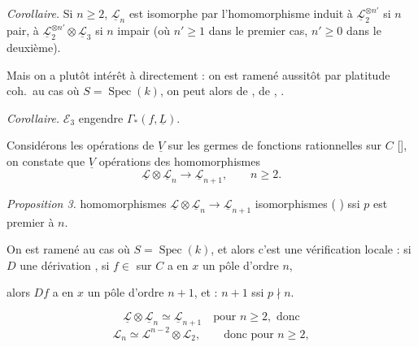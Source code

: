 \documentclass[11pt,a4paper]{article}
\begin{document}
\emph{Corollaire.} Si $n\geqslant 2$, $\underline{\mathcal{L}}_n$ est isomorphe par
l'homomorphisme induit à $\underline{\mathcal{L}}_2^{\otimes n'}$ si $n$ pair, à
$\underline{\mathcal{L}}_2^{\otimes n'}\otimes\underline{\mathcal{L}}_3$ si $n$
impair (où $n'\geqslant 1$ dans le premier cas, $n'\geqslant 0$ dans le deuxième).

Mais on a plutôt intérêt à  directement  : on est ramené aussitôt par
platitude coh.\ au cas où $S=\operatorname{Spec}(k)$, on peut alors \ill{} \ill{}
\ill{} de \ill{} \ill{} \ill{}, \ill{} \ill{} de \ill{} \ill{} \ill{}, \ill{}
\ill{} \ill{} \ill{} \ill{} \ill{} \ill{} \ill{} \ill{}.

\emph{Corollaire.} $\mathcal{E}_3$ engendre $\Gamma_*(f,\underline{L})$.

Considérons les opérations de $\underline{V}$ sur les germes de fonctions rationnelles sur $C$ [], on constate que
$\underline{V}$  opérations  des homomorphismes
\[
\underline{\mathcal{L}}\otimes\underline{\mathcal{L}}_n \longrightarrow
\underline{\mathcal{L}}_{n+1}, \qquad n\geqslant 2 .
\]

\emph{Proposition 3.}    homomorphismes
$\underline{\mathcal{L}}\otimes\underline{\mathcal{L}}_n\to\underline{\mathcal{L}}_{n+1}$
 isomorphismes ( \struck{\ill{}} \ill{} \ill{}) ssi %
$p$ est premier à $n$.

On est ramené au cas où \ill{} \ill{} $S=\operatorname{Spec}(k)$, et alors
c'est une vérification locale : si $D$ \struck{\ill{}} une  dérivation
 \ill{} \ill{}  \ill{},   si $f\in{}$\ill{} sur $C$
a en $x$ un pôle d'ordre $n$, %

 alors  $Df$ a en $x$ un pôle d'ordre  $n+1$, et  : $n+1$ ssi $p\nmid n$.

\[
\underline{\mathcal{L}}\otimes\underline{\mathcal{L}}_n \simeq
\underline{\mathcal{L}}_{n+1} \quad \text{pour } n\geqslant 2, \text{ donc}
\]
 
\[
\mathcal{L}_n \simeq \mathcal{L}^{n-2}\otimes\mathcal{L}_2, \qquad \text{donc pour }
n\geqslant 2,
\]
\end{document}
